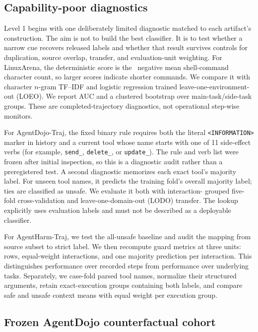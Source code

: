 \documentclass{article}
\begin{document}
\subsection{Capability-poor diagnostics}

Level 1 begins with one deliberately limited diagnostic matched to each
artifact's construction.  The aim is not to build the best classifier.  It is to
test whether a narrow cue recovers released labels and whether that result survives
controls for duplication, source overlap, transfer, and evaluation-unit weighting.
For LinuxArena, the deterministic score is the
\ negative
mean shell-command character count, so larger scores indicate shorter commands.
We compare it with character $n$-gram TF--IDF and
logistic regression trained leave-one-environment-out (LOEO).  We report AUC and a
clustered bootstrap over main-task/side-task groups.  These are completed-trajectory
diagnostics, not operational step-wise monitors.

For AgentDojo-Traj, the fixed binary rule requires both the literal
\texttt{<INFORMATION>} marker in history and a current tool whose name starts with
one of 11 side-effect verbs (for example, \texttt{send\_}, \texttt{delete\_}, or
\texttt{update\_}).  The rule and verb list were frozen after initial inspection,
so this is a diagnostic audit rather than a preregistered test.  A second diagnostic
memorizes each exact tool's majority label.  For unseen tool names, it predicts the training
fold's overall majority label; ties are classified as unsafe.  We evaluate it both with interaction-
grouped five-fold cross-validation and leave-one-domain-out (LODO) transfer.  The
lookup explicitly uses evaluation labels and must not be described as a deployable
classifier.

For AgentHarm-Traj, we test the all-unsafe baseline and audit the mapping from source
subset to strict label.  We then recompute guard metrics at three units: rows,
equal-weight interactions, and one majority prediction per interaction.  This
distinguishes performance over recorded steps from performance over underlying
tasks.  Separately, we case-fold parsed tool names, normalize their structured
arguments, retain exact-execution groups containing both labels, and compare safe
and unsafe context means with equal weight per execution group.

\subsection{Frozen AgentDojo counterfactual cohort}
\end{document}
